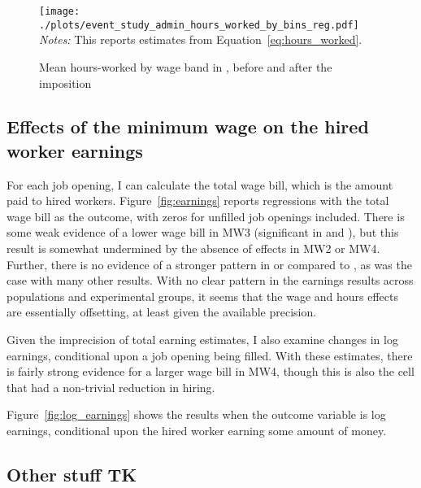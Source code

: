 \begin{figure}[h!]
\centering 
\caption{Mean hours-worked by wage band in \admin{}, before and after the imposition}
\label{fig:event_study_admin_hours_worked_by_bins_reg} 
\begin{minipage}{0.90 \linewidth}
\texttt{[image: ./plots/event\_study\_admin\_hours\_worked\_by\_bins\_reg.pdf]} 
{\footnotesize
  \emph{Notes:} This reports estimates from Equation~\ref{eq:hours_worked}. 
}
\end{minipage} 
\end{figure} 


\subsection{Effects of the minimum wage on the hired worker earnings} \label{sec:earnings} 

For each job opening, I can calculate the total wage bill, which is the amount paid to hired workers.  
Figure~\ref{fig:earnings} reports regressions with the total wage bill as the outcome, with zeros for unfilled job openings included. 
There is some weak evidence of a lower wage bill in MW3 (significant in \admin{} and \lpw{}), but this result is somewhat undermined by the absence of effects in MW2 or MW4.
Further, there is no evidence of a stronger pattern in \admin{} or \lpw{} compared to \all{}, as was the case with many other results. 
With no clear pattern in the earnings results across populations and experimental groups, it seems that the wage and hours effects are essentially offsetting, at least given the available precision. 



Given the imprecision of total earning estimates, I also examine changes in log earnings, conditional upon a job opening being filled. 
With these estimates, there is fairly strong evidence for a larger wage bill in MW4, though this is also the cell that had a non-trivial reduction in hiring. 

Figure~\ref{fig:log_earnings} shows the results when the outcome variable is log earnings, conditional upon the hired worker earning some amount of money.





\subsection{Other stuff TK}

